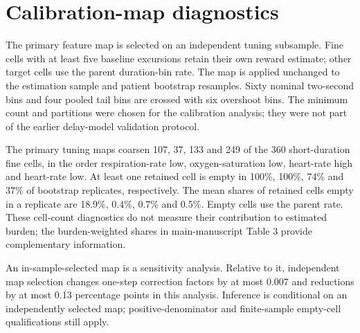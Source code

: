 \documentclass[11pt,letterpaper]{article}
\begin{document}


\section{Calibration-map diagnostics}\label{s:impl}

The primary feature map is selected on an independent tuning subsample. Fine cells with at least five baseline excursions retain their own reward estimate; other target cells use the parent duration-bin rate. The map is applied unchanged to the estimation sample and patient bootstrap resamples. Sixty nominal two-second bins and four pooled tail bins are crossed with six overshoot bins. The minimum count and partitions were chosen for the calibration analysis; they were not part of the earlier delay-model validation protocol.

The primary tuning maps coarsen 107, 37, 133 and 249 of the 360 short-duration fine cells, in the order respiration-rate low, oxygen-saturation low, heart-rate high and heart-rate low. At least one retained cell is empty in 100\%, 100\%, 74\% and 37\% of bootstrap replicates, respectively. The mean shares of retained cells empty in a replicate are 18.9\%, 0.4\%, 0.7\% and 0.5\%. Empty cells use the parent rate. These cell-count diagnostics do not measure their contribution to estimated burden; the burden-weighted shares in main-manuscript Table 3 provide complementary information.

An in-sample-selected map is a sensitivity analysis. Relative to it, independent map selection changes one-step correction factors by at most 0.007 and reductions by at most 0.13 percentage points in this analysis. Inference is conditional on an independently selected map; positive-denominator and finite-sample empty-cell qualifications still apply.

\end{document}

